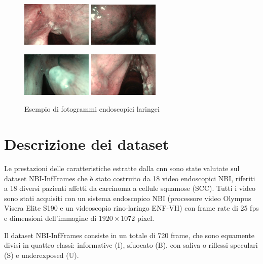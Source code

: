 \begin{figure}[ht]
    \centering
    \includegraphics[width=0.3\textwidth]{introduzione/Larynge-1.jpg}
    \includegraphics[width=0.3\textwidth]{introduzione/Larynge-2.jpg}

    \includegraphics[width=0.3\textwidth]
    {introduzione/Larynge-3.jpg}
    \includegraphics[width=0.3\textwidth]{introduzione/Larynge-4.jpg}
    \caption{Esempio di fotogrammi endoscopici laringei}
    \label{fig:larynges}
\end{figure}

\section{Descrizione dei dataset}\label{descrizione-dei-dataset}

Le prestazioni delle caratteristiche estratte dalla
\gls{cnn} sono state valutate sul dataset
NBI-InfFrames  che
è stato costruito da 18 video endoscopici NBI, riferiti a
18 diversi pazienti affetti da carcinoma a cellule squamose
(SCC). Tutti i video sono stati acquisiti con un sistema endoscopico
NBI (processore video Olympus Visera Elite S190 e
un videoscopio rino-laringo ENF-VH) con frame rate di
25 fps e dimensioni dell'immagine di \(1920\times 1072\) pixel.

Il dataset NBI-InfFrames consiste in un totale di 720 frame, che sono equamente divisi in quattro classi: informative (I), sfuocato (B), con saliva o riflessi speculari (S) e underexposed  (U). 

